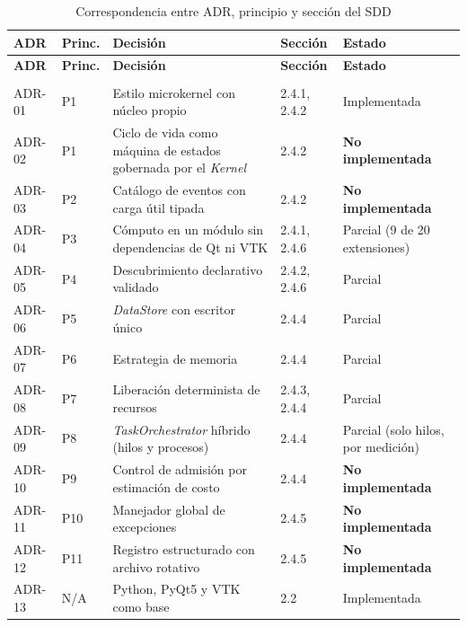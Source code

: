 \documentclass[12pt,letterpaper,oneside]{article}
\DeclareRobustCommand{\_}{\textunderscore\allowbreak}
\begin{document}
\begin{center}
\small
\begin{longtable}{|p{}|p{}|p{}|p{}|p{}|}
\hline
\textbf{ADR} & \textbf{Princ.} & \textbf{Decisión} & \textbf{Sección} & \textbf{Estado} \\
\hline
\endfirsthead
\hline
\textbf{ADR} & \textbf{Princ.} & \textbf{Decisión} & \textbf{Sección} & \textbf{Estado} \\
\hline
\endhead
\hline
\endfoot
\hline
\caption{Correspondencia entre ADR, principio y sección del SDD} \label{tab:sdd_traza_adr} \\
\endlastfoot

ADR-01 & P1 & Estilo microkernel con núcleo propio & 2.4.1, 2.4.2 & Implementada \\
\hline
ADR-02 & P1 & Ciclo de vida como máquina de estados gobernada por el \textit{Kernel} & 2.4.2 & \textbf{No implementada} \\
\hline
ADR-03 & P2 & Catálogo de eventos con carga útil tipada & 2.4.2 & \textbf{No implementada} \\
\hline
ADR-04 & P3 & Cómputo en un módulo sin dependencias de Qt ni VTK & 2.4.1, 2.4.6 & Parcial (9 de 20 extensiones) \\
\hline
ADR-05 & P4 & Descubrimiento declarativo validado & 2.4.2, 2.4.6 & Parcial \\
\hline
ADR-06 & P5 & \textit{DataStore} con escritor único & 2.4.4 & Parcial \\
\hline
ADR-07 & P6 & Estrategia de memoria & 2.4.4 & Parcial \\
\hline
ADR-08 & P7 & Liberación determinista de recursos & 2.4.3, 2.4.4 & Parcial \\
\hline
ADR-09 & P8 & \textit{TaskOrchestrator} híbrido (hilos y procesos) & 2.4.4 & Parcial (solo hilos, por medición) \\
\hline
ADR-10 & P9 & Control de admisión por estimación de costo & 2.4.4 & \textbf{No implementada} \\
\hline
ADR-11 & P10 & Manejador global de excepciones & 2.4.5 & \textbf{No implementada} \\
\hline
ADR-12 & P11 & Registro estructurado con archivo rotativo & 2.4.5 & \textbf{No implementada} \\
\hline
ADR-13 & N/A & Python, PyQt5 y VTK como base & 2.2 & Implementada \\
\hline

\end{longtable}
\end{center}
\end{document}
